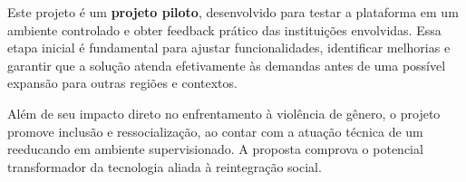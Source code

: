 \par Este projeto é um \textbf{projeto piloto}, desenvolvido para testar a plataforma em um ambiente controlado e obter feedback prático das instituições envolvidas. Essa etapa inicial é fundamental para ajustar funcionalidades, identificar melhorias e garantir que a solução atenda efetivamente às demandas antes de uma possível expansão para outras regiões e contextos.

\par Além de seu impacto direto no enfrentamento à violência de gênero, o projeto promove inclusão e ressocialização, ao contar com a atuação técnica de um reeducando em ambiente supervisionado. A proposta comprova o potencial transformador da tecnologia aliada à reintegração social.
